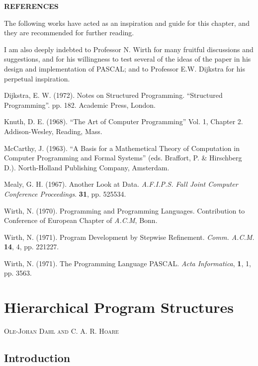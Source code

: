 \documentclass[twoside,11pt]{book}
\begin{document}
\noindent
\textbf{REFERENCES}
\medskip
\nopagebreak

\noindent
The following works have acted as an inspiration and guide for this chapter, and they are recommended for further reading.

I am also deeply indebted to Professor N. Wirth for many fruitful discussions and suggestions, and for his willingness to test several of the ideas of the paper in his design and implementation of PASCAL; and to Professor E.W. Dijkstra for his perpetual inspiration.
\medskip

\noindent
Dijkstra, E. W. (1972). Notes on Structured Programming. ``Structured Programming''. pp. 1\textendash{}82. Academic Press, London.
\medskip

\noindent
Knuth, D. E. (1968). ``The Art of Computer Programming'' Vol. 1, Chapter 2. Addison-Wesley, Reading, Mass.
\medskip

\noindent
McCarthy, J. (1963). ``A Basis for a Mathemetical Theory of Computation in Computer Programming and Formal Systems'' (eds. Braffort, P. \& Hirschberg D.). North-Holland Publishing Company, Amsterdam.
\medskip

\noindent
Mealy, G. H. (1967). Another Look at Data. \textit{A.F.I.P.S. Fall Joint Computer Conference Proceedings}. \textbf{31}, pp. 525\textendash{}534.
\medskip

\noindent
Wirth, N. (1970). Programming and Programming Languages. Contribution to Conference of European Chapter of \textit{A.C.M}, Bonn.
\medskip

\noindent
Wirth, N. (1971). Program Development by Stepwise Refinement. \textit{Comm. A.C.M.} \textbf{14}, 4, pp. 221\textendash{}227.
\medskip

\noindent
Wirth, N. (1971). The Programming Language PASCAL. \textit{Acta Informatica}, \textbf{1}, 1, pp. 35\textendash{}63.
\clearpage
\clearpage
\chapter{Hierarchical Program Structures}

{
	\noindent
	\scshape\hfill\scriptsize Ole-Johan Dahl and C. A. R. Hoare\hfill
}
\renewcommand{\leftmark}{\normalfont\scriptsize\hfill OLE-JOHAN DAHL AND C. A. R. HOARE\hfill}
\medskip

\section{Introduction}
\end{document}
